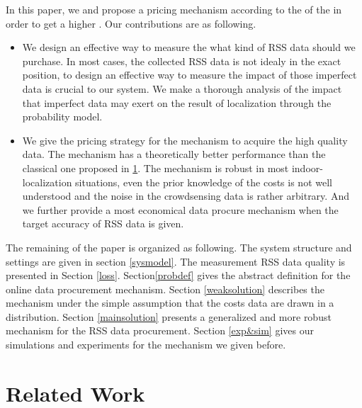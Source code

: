 \documentclass[10pt,conference,compsocconf,letterpaper]{IEEEtran}
\begin{document}
In this paper, we and propose a pricing mechanism according to the of the in order to get a higher  . Our contributions are as following.


\begin{itemize}

\item  We design an effective way to measure the what kind of RSS data should we purchase. In most cases, the collected RSS data is not idealy in the exact position, to design an effective way to measure the impact of those imperfect data is crucial to our system. We make a thorough analysis of the impact that imperfect data may exert on the result of localization through the  probability model. 

\item We give the pricing strategy for the mechanism to acquire the high quality data. The mechanism has a theoretically better performance than the classical one proposed in \ref{}. The mechanism is robust in most indoor-localization situations, even the prior knowledge of the costs is not well understood and the noise in the crowdsensing data is rather arbitrary. And we further provide a most economical data procure mechanism when the target accuracy of RSS data is given.

\end{itemize}

The remaining of the paper is organized as following. The system structure and settings are given in section \ref{sysmodel}. The measurement  RSS data quality is presented in Section \ref{loss}. Section\ref{probdef}  gives the abstract definition for the online data procurement mechanism. Section \ref{weaksolution} describes the mechanism under the simple assumption that the costs data are drawn in a distribution. Section \ref{mainsolution} presents a generalized and more robust mechanism for the RSS data procurement. Section \ref{exp&sim} gives our simulations and experiments for the mechanism we given before.



\section{Related Work \label{sectionrelatedwork}}
\end{document}
